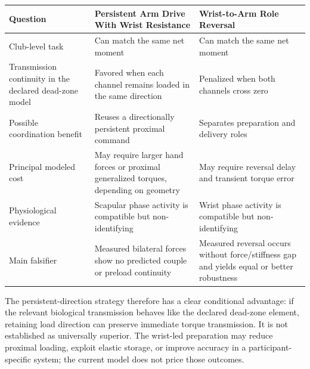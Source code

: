 \documentclass[
  letterpaper,
]{report}
\begin{document}
\begin{longtable}[]{@{}
  >{\raggedright\arraybackslash}p{}
  >{\raggedright\arraybackslash}p{}
  >{\raggedright\arraybackslash}p{}@{}}
\toprule\noalign{}
\begin{minipage}[b]{\linewidth}\raggedright
Question
\end{minipage} & \begin{minipage}[b]{\linewidth}\raggedright
Persistent Arm Drive With Wrist Resistance
\end{minipage} & \begin{minipage}[b]{\linewidth}\raggedright
Wrist-to-Arm Role Reversal
\end{minipage} \\
\midrule\noalign{}
\endhead
\bottomrule\noalign{}
\endlastfoot
Club-level task & Can match the same net moment & Can match the same net
moment \\
Transmission continuity in the declared dead-zone model & Favored when
each channel remains loaded in the same direction & Penalized when both
channels cross zero \\
Possible coordination benefit & Reuses a directionally persistent
proximal command & Separates preparation and delivery roles \\
Principal modeled cost & May require larger hand forces or proximal
generalized torques, depending on geometry & May require reversal delay
and transient torque error \\
Physiological evidence & Scapular phase activity is compatible but
non-identifying & Wrist phase activity is compatible but
non-identifying \\
Main falsifier & Measured bilateral forces show no predicted couple or
preload continuity & Measured reversal occurs without force/stiffness
gap and yields equal or better robustness \\
\end{longtable}

The persistent-direction strategy therefore has a clear conditional
advantage: if the relevant biological transmission behaves like the
declared dead-zone element, retaining load direction can preserve
immediate torque transmission. It is not established as universally
superior. The wrist-led preparation may reduce proximal loading, exploit
elastic storage, or improve accuracy in a participant-specific system;
the current model does not price those outcomes.
\end{document}
